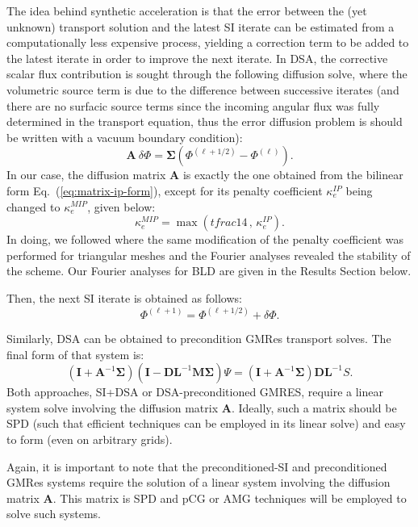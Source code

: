 \documentclass{mc2013}
\newcommand\bs{\boldsymbol}
\renewcommand{\(}{\left(}
\renewcommand{\)}{\right)}
\renewcommand{\[}{\left[}
\renewcommand{\]}{\right]}
\newcommand{\eqt}[1]{Eq.~(\ref{#1})}                     %
\begin{document}
The idea behind synthetic acceleration is that the error between the (yet
unknown) transport solution and the latest SI iterate can be estimated from a
computationally less expensive process, yielding a correction term to be added
to the latest iterate in order to improve the next iterate. In DSA, the
corrective scalar flux contribution is sought through the following
diffusion solve, where the volumetric source term is due to the difference between
successive iterates (and there are no surfacic source terms since the incoming angular flux was
fully determined in the transport equation, thus the error diffusion problem is should 
be written with a vacuum boundary condition):
\begin{equation}
  \bs{A}\ \delta \Phi = \bs{\Sigma}\(\Phi^{(\ell+1/2)} - \Phi^{(\ell)}\).
\end{equation}
In our case, the diffusion matrix $\bs{A}$ is exactly the one obtained from the bilinear form \eqt{eq:matrix-ip-form},
except for its penalty coefficient $\kappa_e^{IP}$ being changed to $\kappa_e^{MIP}$, given below: 
\begin{equation}
\kappa_e^{MIP} = \max \( tfrac{1}{4}\, , \, \kappa_e^{IP} \) .
\end{equation}
In doing, we followed \cite{mip} where the same modification of the penalty coefficient was performed 
for triangular meshes and the Fourier analyses revealed the stability of the scheme. 
Our Fourier analyses for BLD are given in the Results Section below.

Then, the next SI iterate is obtained as follows:
\begin{equation}
  \Phi^{(\ell+1)} = \Phi^{(\ell+1/2)}+\delta \Phi.
\end{equation}

Similarly, DSA can be obtained to precondition GMRes transport solves. The
final form of that system is:
\begin{equation}
  \(\bs{I} +\bs{A}^{-1} \bs{\Sigma}\)\(\bs{I}-\bs{DL}^{-1}\bs{M\Sigma}\) \Psi
  = \(\bs{I}+\bs{A}^{-1}\bs{\Sigma}\) \bs{DL}^{-1} S.
\end{equation}
Both approaches, SI+DSA or DSA-preconditioned GMRES, require a linear system
solve involving the diffusion matrix $\bs{A}$. Ideally, such a matrix should
be SPD (such that efficient techniques can be employed in its linear solve)
and easy to form (even on arbitrary grids).

Again, it is important to note that the preconditioned-SI and preconditioned GMRes systems 
require the solution of a linear system involving the diffusion matrix $\bs{A}$. This matrix is 
SPD and pCG or AMG techniques will be employed to solve such systems.
\end{document}
